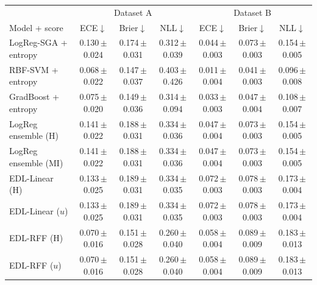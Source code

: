 \begin{tabular}{lccc|ccc}\toprule
 & \multicolumn{3}{c}{Dataset A} & \multicolumn{3}{c}{Dataset B}\\
Model + score & ECE$\downarrow$ & Brier$\downarrow$ & NLL$\downarrow$ & ECE$\downarrow$ & Brier$\downarrow$ & NLL$\downarrow$\\\midrule
LogReg-SGA + entropy & 0.130\,{\scriptsize$\pm$0.024} & 0.174\,{\scriptsize$\pm$0.031} & 0.312\,{\scriptsize$\pm$0.039} & 0.044\,{\scriptsize$\pm$0.003} & 0.073\,{\scriptsize$\pm$0.003} & 0.154\,{\scriptsize$\pm$0.005}\\
RBF-SVM + entropy & 0.068\,{\scriptsize$\pm$0.022} & 0.147\,{\scriptsize$\pm$0.037} & 0.403\,{\scriptsize$\pm$0.426} & 0.011\,{\scriptsize$\pm$0.004} & 0.041\,{\scriptsize$\pm$0.003} & 0.096\,{\scriptsize$\pm$0.008}\\
GradBoost + entropy & 0.075\,{\scriptsize$\pm$0.020} & 0.149\,{\scriptsize$\pm$0.036} & 0.314\,{\scriptsize$\pm$0.094} & 0.033\,{\scriptsize$\pm$0.003} & 0.047\,{\scriptsize$\pm$0.004} & 0.108\,{\scriptsize$\pm$0.007}\\
LogReg ensemble (H) & 0.141\,{\scriptsize$\pm$0.022} & 0.188\,{\scriptsize$\pm$0.031} & 0.334\,{\scriptsize$\pm$0.036} & 0.047\,{\scriptsize$\pm$0.004} & 0.073\,{\scriptsize$\pm$0.003} & 0.154\,{\scriptsize$\pm$0.005}\\
LogReg ensemble (MI) & 0.141\,{\scriptsize$\pm$0.022} & 0.188\,{\scriptsize$\pm$0.031} & 0.334\,{\scriptsize$\pm$0.036} & 0.047\,{\scriptsize$\pm$0.004} & 0.073\,{\scriptsize$\pm$0.003} & 0.154\,{\scriptsize$\pm$0.005}\\
EDL-Linear (H) & 0.133\,{\scriptsize$\pm$0.025} & 0.189\,{\scriptsize$\pm$0.031} & 0.334\,{\scriptsize$\pm$0.035} & 0.072\,{\scriptsize$\pm$0.003} & 0.078\,{\scriptsize$\pm$0.003} & 0.173\,{\scriptsize$\pm$0.004}\\
EDL-Linear ($u$) & 0.133\,{\scriptsize$\pm$0.025} & 0.189\,{\scriptsize$\pm$0.031} & 0.334\,{\scriptsize$\pm$0.035} & 0.072\,{\scriptsize$\pm$0.003} & 0.078\,{\scriptsize$\pm$0.003} & 0.173\,{\scriptsize$\pm$0.004}\\
EDL-RFF (H) & 0.070\,{\scriptsize$\pm$0.016} & 0.151\,{\scriptsize$\pm$0.028} & 0.260\,{\scriptsize$\pm$0.040} & 0.058\,{\scriptsize$\pm$0.004} & 0.089\,{\scriptsize$\pm$0.009} & 0.183\,{\scriptsize$\pm$0.013}\\
EDL-RFF ($u$) & 0.070\,{\scriptsize$\pm$0.016} & 0.151\,{\scriptsize$\pm$0.028} & 0.260\,{\scriptsize$\pm$0.040} & 0.058\,{\scriptsize$\pm$0.004} & 0.089\,{\scriptsize$\pm$0.009} & 0.183\,{\scriptsize$\pm$0.013}\\
\bottomrule\end{tabular}